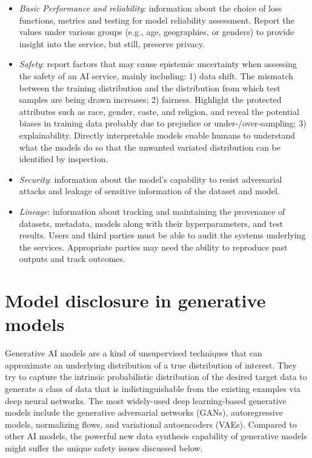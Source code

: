 \documentclass[conference]{IEEEtran}
\begin{document}
\begin{itemize}
\item \textit{Basic Performance and reliability}: information about the choice of loss functions, metrics and testing for model reliability assessment. Report the values under various groups (e.g., age, geographies, or genders) to provide insight into the service, but still,
preserve privacy. 
\item \textit{Safety}: report factors that may cause epistemic uncertainty when assessing the safety of an AI service, mainly including: 1) data shift. The mismatch between the training distribution and the distribution from which test samples are being drawn increases; 2) fairness. 
Highlight the protected attributes such as race, gender, caste, and religion, and reveal the potential biases in training data probably due to prejudice or under-/over-sampling; 3) explainability. Directly interpretable models enable humans to understand what the models do so that the unwanted variated distribution can be identified by inspection.
\item \textit{Security}: information about the model's capability to resist adversarial attacks and leakage of sensitive information of the dataset and model.
\item \textit{Lineage}: information about tracking and maintaining the provenance of datasets, metadata, models along with their hyperparameters, and test results. 
Users and third parties must be able to audit the systems underlying the services. Appropriate parties may need the ability to reproduce past outputs and track outcomes. 
\end{itemize}

\section*{Model disclosure in generative models}
\label{gm-disc}
Generative AI models are a kind of unsupervised techniques that can approximate an underlying distribution of a true distribution of interest. 
They try to capture the intrinsic probabilistic distribution of the desired target data to generate a class of data that is indistinguishable from the existing examples via deep neural networks.
The most widely-used deep learning-based generative models include the generative adversarial networks (GANs), autoregressive models, normalizing flows, and variational autoencoders (VAEs).
Compared to other AI models, the powerful new data synthesis capability of generative models might suffer the unique safety issues discussed below. 
\end{document}
